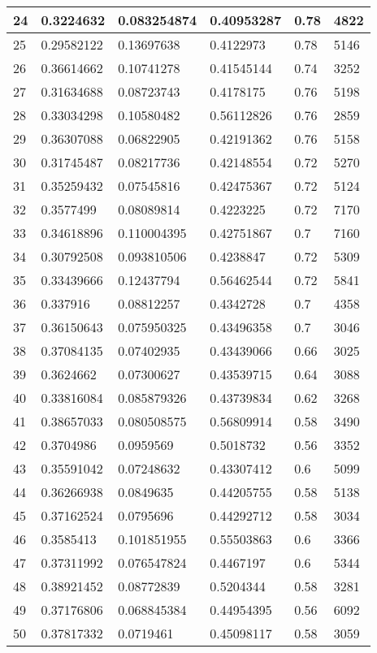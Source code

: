 \begin{longtable}{|l|l|l|l|l|l|}
24 & 0.3224632 & 0.083254874 & 0.40953287 & 0.78 & 4822 \\ \hline 
25 & 0.29582122 & 0.13697638 & 0.4122973 & 0.78 & 5146 \\ \hline 
26 & 0.36614662 & 0.10741278 & 0.41545144 & 0.74 & 3252 \\ \hline 
27 & 0.31634688 & 0.08723743 & 0.4178175 & 0.76 & 5198 \\ \hline 
28 & 0.33034298 & 0.10580482 & 0.56112826 & 0.76 & 2859 \\ \hline 
29 & 0.36307088 & 0.06822905 & 0.42191362 & 0.76 & 5158 \\ \hline 
30 & 0.31745487 & 0.08217736 & 0.42148554 & 0.72 & 5270 \\ \hline 
31 & 0.35259432 & 0.07545816 & 0.42475367 & 0.72 & 5124 \\ \hline 
32 & 0.3577499 & 0.08089814 & 0.4223225 & 0.72 & 7170 \\ \hline 
33 & 0.34618896 & 0.110004395 & 0.42751867 & 0.7 & 7160 \\ \hline 
34 & 0.30792508 & 0.093810506 & 0.4238847 & 0.72 & 5309 \\ \hline 
35 & 0.33439666 & 0.12437794 & 0.56462544 & 0.72 & 5841 \\ \hline 
36 & 0.337916 & 0.08812257 & 0.4342728 & 0.7 & 4358 \\ \hline 
37 & 0.36150643 & 0.075950325 & 0.43496358 & 0.7 & 3046 \\ \hline 
38 & 0.37084135 & 0.07402935 & 0.43439066 & 0.66 & 3025 \\ \hline 
39 & 0.3624662 & 0.07300627 & 0.43539715 & 0.64 & 3088 \\ \hline 
40 & 0.33816084 & 0.085879326 & 0.43739834 & 0.62 & 3268 \\ \hline 
41 & 0.38657033 & 0.080508575 & 0.56809914 & 0.58 & 3490 \\ \hline 
42 & 0.3704986 & 0.0959569 & 0.5018732 & 0.56 & 3352 \\ \hline 
43 & 0.35591042 & 0.07248632 & 0.43307412 & 0.6 & 5099 \\ \hline 
44 & 0.36266938 & 0.0849635 & 0.44205755 & 0.58 & 5138 \\ \hline 
45 & 0.37162524 & 0.0795696 & 0.44292712 & 0.58 & 3034 \\ \hline 
46 & 0.3585413 & 0.101851955 & 0.55503863 & 0.6 & 3366 \\ \hline 
47 & 0.37311992 & 0.076547824 & 0.4467197 & 0.6 & 5344 \\ \hline 
48 & 0.38921452 & 0.08772839 & 0.5204344 & 0.58 & 3281 \\ \hline 
49 & 0.37176806 & 0.068845384 & 0.44954395 & 0.56 & 6092 \\ \hline 
50 & 0.37817332 & 0.0719461 & 0.45098117 & 0.58 & 3059 \\ \hline 
\end{longtable}